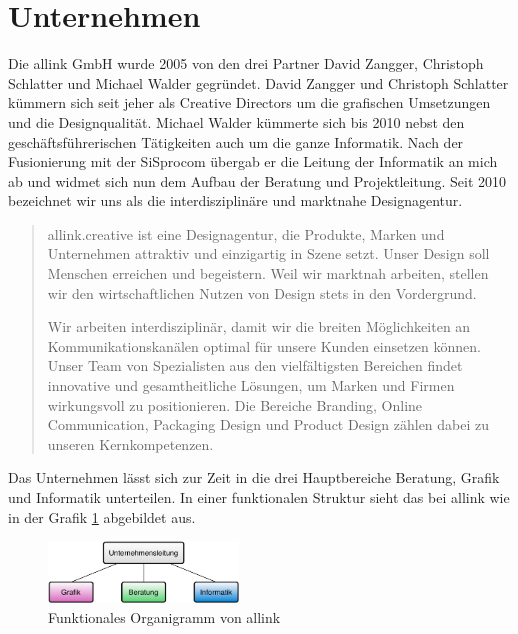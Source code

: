 \section{Unternehmen}
Die allink GmbH wurde 2005 von den drei Partner David Zangger, Christoph Schlatter
und Michael Walder gegründet. David Zangger und Christoph Schlatter kümmern sich
seit jeher als Creative Directors um die grafischen Umsetzungen und die Designqualität.
Michael Walder kümmerte sich bis 2010 nebst den geschäftsführerischen Tätigkeiten
auch um die ganze Informatik. Nach der Fusionierung mit der SiSprocom übergab
er die Leitung der Informatik an mich ab und widmet sich nun dem Aufbau der
Beratung und Projektleitung. Seit 2010 bezeichnet wir uns als die interdisziplinäre 
und marktnahe Designagentur.

\begin{quote}
allink.creative ist eine Designagentur, die Produkte, Marken und Unternehmen 
attraktiv und einzigartig in Szene setzt. Unser Design soll Menschen erreichen 
und begeistern. Weil wir marktnah arbeiten, stellen wir den wirtschaftlichen 
Nutzen von Design stets in den Vordergrund.

Wir arbeiten interdisziplinär, damit wir die breiten Möglichkeiten an 
Kommunikationskanälen optimal für unsere Kunden einsetzen können. Unser 
Team von Spezialisten aus den vielfältigsten Bereichen findet innovative 
und gesamtheitliche Lösungen, um Marken und Firmen wirkungsvoll zu positionieren. 
Die Bereiche Branding, Online Communication, Packaging Design und Product 
Design zählen dabei zu unseren Kernkompetenzen.
\end{quote}

Das Unternehmen lässt sich zur Zeit in die drei Hauptbereiche Beratung, Grafik
und Informatik unterteilen. In einer funktionalen Struktur sieht das bei allink wie in
der Grafik \ref{pic:funktionales_organigramm} abgebildet aus.

\begin{figure}[htbp]
\begin{center}
\includegraphics[width=0.45\textwidth,angle=0]{./bilder/analyse/funktionales_organigramm.pdf}
\caption{Funktionales Organigramm von allink}
\label{pic:funktionales_organigramm}
\end{center}
\end{figure}

